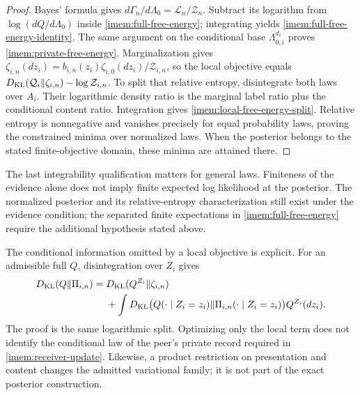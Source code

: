 \begin{proof}
Bayes' formula gives $d\Gamma_n/d\Lambda_0=\mathcal L_n/\mathcal Z_n$. Subtract its logarithm from $\log(dQ/d\Lambda_0)$ inside \cref{imem:full-free-energy}; integrating yields \cref{imem:full-free-energy-identity}. The same argument on the conditional base $\Lambda_{0,i}^{d_i}$ proves \cref{imem:private-free-energy}. Marginalization gives
$\zeta_{i,n}(dz_i)=b_{i,n}(z_i)\zeta_{i,0}(dz_i)/\mathcal Z_{i,n}$, so the local objective equals $D_{\mathrm{KL}}(\mathcal Q_i\Vert\zeta_{i,n})-\log\mathcal Z_{i,n}$. To split that relative entropy, disintegrate both laws over $A_i$. Their logarithmic density ratio is the marginal label ratio plus the conditional content ratio. Integration gives \cref{imem:local-free-energy-split}. Relative entropy is nonnegative and vanishes precisely for equal probability laws, proving the constrained minima over normalized laws. When the posterior belongs to the stated finite-objective domain, these minima are attained there.
\end{proof}

The last integrability qualification matters for general laws. Finiteness of the evidence alone does not imply finite expected log likelihood at the posterior. The normalized posterior and its relative-entropy characterization still exist under the evidence condition; the separated finite expectations in \cref{imem:full-free-energy} require the additional hypothesis stated above.

The conditional information omitted by a local objective is explicit. For an admissible full $Q$, disintegration over $Z_i$ gives
\begin{equation}
 \begin{split}
 D_{\mathrm{KL}}(Q\Vert\Pi_{i,n})
 ={}&D_{\mathrm{KL}}(Q^{Z_i}\Vert\zeta_{i,n})\\
 &+\int D_{\mathrm{KL}}\bigl(Q(\cdot\mid Z_i=z_i)
 \Vert\Pi_{i,n}(\cdot\mid Z_i=z_i)\bigr)Q^{Z_i}(dz_i).
 \end{split}
 \label{imem:omitted-conditional}
\end{equation}
The proof is the same logarithmic split. Optimizing only the local term does not identify the conditional law of the peer's private record required in \cref{imem:receiver-update}. Likewise, a product restriction on presentation and content changes the admitted variational family; it is not part of the exact posterior construction.

